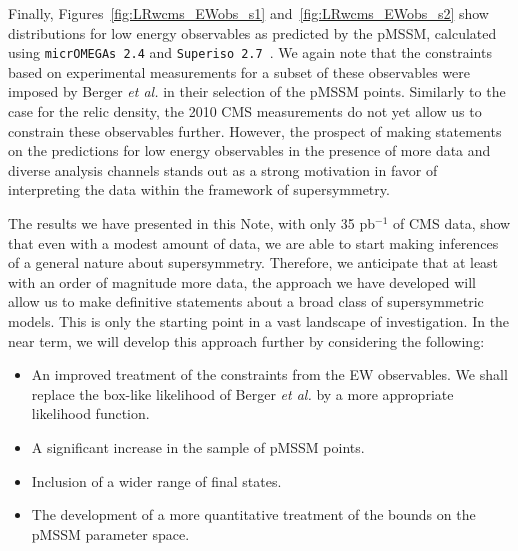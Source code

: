 Finally, Figures~\ref{fig:LRwcms_EWobs_s1} and~\ref{fig:LRwcms_EWobs_s2} show distributions for low energy observables as predicted by the pMSSM, calculated using {\tt micrOMEGAs 2.4} and {\tt Superiso 2.7}~\cite{Mahmoudi:2008tp}.  We again note that the constraints based on experimental measurements for a subset of these observables were imposed
by Berger {\it et al.} in their selection of the pMSSM points.  Similarly to the case for the relic density, the 2010 CMS measurements do not yet allow us to constrain these observables further.  However, the prospect of making statements on the predictions for low energy observables in the presence of more data and diverse analysis channels stands out as a strong motivation in favor of interpreting the data within the framework of supersymmetry.

The results we have presented in this Note, with only 35 pb$^{-1}$ of CMS data, show that even with a modest amount of data, we are able to start making inferences of a general nature
about supersymmetry. 
Therefore, we anticipate that at least with an order of magnitude more data, the approach we have developed will allow us to make definitive statements about a broad class of supersymmetric models.  
This is only the starting point in a vast landscape of investigation. In the near term, 
we will develop this approach further by considering the following:

\begin{itemize}
\item An improved treatment of the constraints from the EW observables.  We shall replace the box-like likelihood of Berger {\it et al.} by a more appropriate likelihood function.
\item A significant increase in the sample of pMSSM points. 
\item Inclusion of a wider range of final states.
\item The development of a more quantitative treatment of the bounds on the pMSSM parameter space.
\end{itemize}


